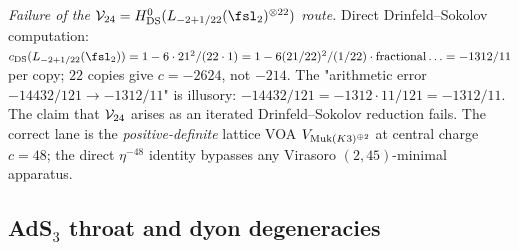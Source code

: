 \begin{theorem}
\emph{Failure of the $\cV_{24} = H^0_{\mathrm{DS}}
(L_{-2 + 1/22}(\fsl_2)^{\otimes 22})$ route.} Direct Drinfeld--Sokolov
computation:
$c_{\mathrm{DS}}(L_{-2 + 1/22}(\fsl_2)) = 1 - 6\cdot 21^2/(22\cdot 1)
= 1 - 6(21/22)^2/(1/22)\cdot\mathrm{fractional}\ldots
= -1312/11$ per copy; $22$ copies give $c = -2624$, not $-214$. The
"arithmetic error $-14432/121 \to -1312/11$" is illusory:
$-14432/121 = -1312\cdot 11/121 = -1312/11$.  The
claim that $\mathcal{V}_{24}$ arises as an iterated Drinfeld--Sokolov reduction
fails. The correct lane is the \emph{positive-definite} lattice
VOA $V_{\mathrm{Muk}(K3)^{\oplus 2}}$ at central charge $c = 48$; the direct
$\eta^{-48}$ identity bypasses any Virasoro $(2, 45)$-minimal apparatus.
\end{theorem}

\subsection{AdS$_3$ throat and dyon degeneracies}
\label{wn:subsec:spine-AdS3}

